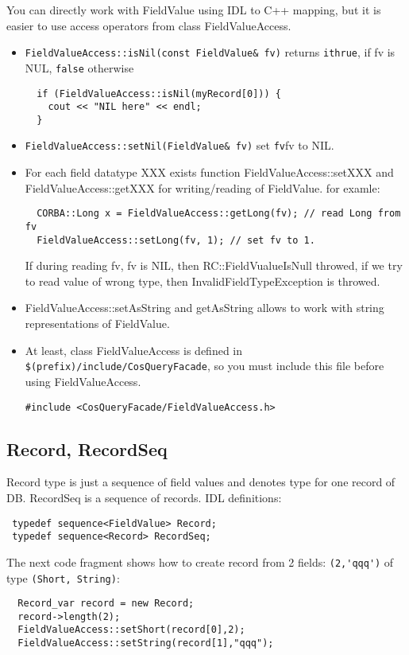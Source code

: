 \documentclass[10pt]{article}
\begin{document}
   You can directly work with FieldValue using IDL to C++ mapping, but it 
   is easier to use 
   access operators from class FieldValueAccess.
  \begin{itemize}
   \item \verb|FieldValueAccess::isNil(const FieldValue& fv)| returns 
    \verb|ithrue|, 
    if fv is NUL, \verb|false| otherwise
\begin{verbatim}
  if (FieldValueAccess::isNil(myRecord[0])) {
    cout << "NIL here" << endl;
  }
\end{verbatim}
   \item \verb|FieldValueAccess::setNil(FieldValue& fv)| set \verb|fv|fv to NIL. 
   \item For each field datatype XXX exists function FieldValueAccess::setXXX 
  and
   FieldValueAccess::getXXX for writing/reading of FieldValue.
 \newline
   for examle:
\begin{verbatim}
  CORBA::Long x = FieldValueAccess::getLong(fv); // read Long from fv
  FieldValueAccess::setLong(fv, 1); // set fv to 1.
\end{verbatim}
   If during reading fv, fv is NIL, then RC::FieldVualueIsNull throwed,
   if we try to read value of wrong type, then InvalidFieldTypeException is
   throwed.
   \item FieldValueAccess::setAsString and getAsString 
         allows to work with string representations of FieldValue.
   \item At least, class FieldValueAccess is defined in \verb|$(prefix)/include/CosQueryFacade|, so you must include this file before using FieldValueAccess.
\begin{verbatim}
#include <CosQueryFacade/FieldValueAccess.h>
\end{verbatim}
  \end{itemize}

\subsection{ Record, RecordSeq }
 Record type is just a sequence of field values and denotes type for one 
  record of DB. RecordSeq is a sequence of records.
 \newline
 IDL definitions:
\begin{verbatim}
 typedef sequence<FieldValue> Record;
 typedef sequence<Record> RecordSeq;
\end{verbatim}
 
The next code fragment shows how to create record from 2 fields: 
\verb|(2,'qqq')| of type \verb|(Short, String)|:
\begin{verbatim}
  Record_var record = new Record;
  record->length(2);
  FieldValueAccess::setShort(record[0],2);
  FieldValueAccess::setString(record[1],"qqq");
\end{verbatim}
\end{document}
